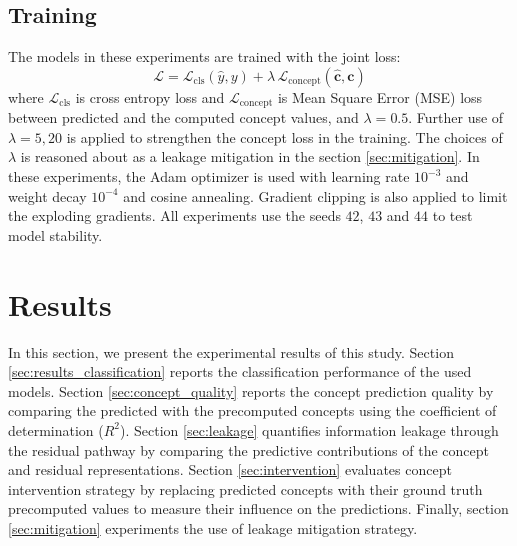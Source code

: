 \documentclass[journal,twoside,web]{ieeecolor}
\begin{document}
\subsection{Training}

The models in these experiments are trained with the joint loss:
\begin{equation}
  \mathcal{L} = \mathcal{L}_{\mathrm{cls}}(\hat{y}, y) +
                \lambda\,\mathcal{L}_{\mathrm{concept}}(\hat{\mathbf{c}},
                \mathbf{c})
  \label{eq:loss}
\end{equation}
where $\mathcal{L}_{\mathrm{cls}}$ is cross entropy loss and $\mathcal{L}_{\mathrm{concept}}$ is Mean Square Error (MSE) loss between predicted and the computed concept values, and $\lambda = 0.5$. Further use of $\lambda = 5, 20$ is applied to strengthen the concept loss in the training. The choices of $\lambda$ is reasoned about as a leakage mitigation in the section \ref{sec:mitigation}. In these experiments, the Adam optimizer is used with learning rate $10^{-3}$ and weight decay $10^{-4}$ and cosine annealing. Gradient clipping is also applied to limit the exploding gradients. All experiments use the seeds $42$, $43$ and $44$ to test model stability.




\section{Results}
In this section, we present the experimental results of this study. Section \ref{sec:results_classification} reports the classification performance of the used models. Section \ref{sec:concept_quality} reports the concept prediction quality by comparing the predicted with the precomputed concepts using the coefficient of determination ($R^2$). Section \ref{sec:leakage} quantifies information leakage through the residual pathway by comparing the predictive contributions of the concept and residual representations. Section \ref{sec:intervention} evaluates concept intervention strategy by replacing predicted concepts with their ground truth precomputed values to measure their influence on the predictions. Finally, section \ref{sec:mitigation} experiments the use of leakage mitigation strategy.
\end{document}
